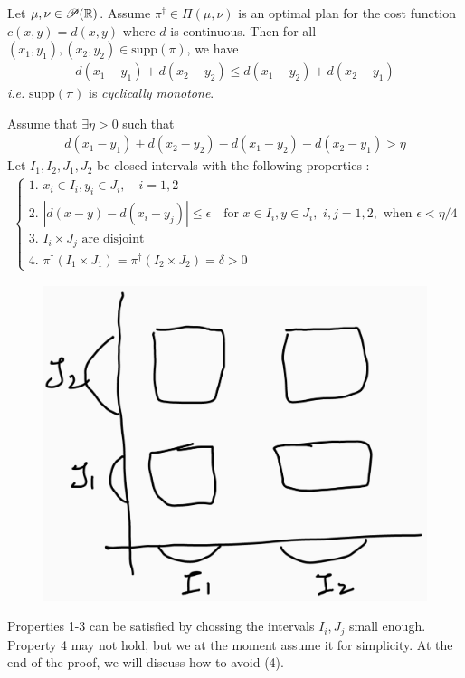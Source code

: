 \documentclass[12pt,a4paper]{article}
\newenvironment{proof}
{\begin{changemargin}{1cm}{0.5cm} 
	}%
	{\end{changemargin}
}
\newenvironment{p}
{\begin{proof} 
	}%
	{\end{proof}
}
\begin{document}
 Let $\mu, \nu \in\mathscr{P}(\mathbb{R})$. Assume $\pi^{\dagger} \in \Pi(\mu, \nu)$ is an optimal plan for the cost function $c(x,y) = d(x,y)$ where $d$ is continuous. Then for all $(x_1, y_1), (x_2, y_2) \in \text{supp}(\pi)$, we have
\begin{align*}
d(x_1 -y_1) + d(x_2-y_2) \leq d(x_1-y_2)+d(x_2-y_1)
\end{align*}
\textit{i.e.} $\text{supp}(\pi)$ is \emph{cyclically monotone}.
\begin{p}
\pf Assume that $\exists \eta>0$ such that
\begin{align*}
d(x_1-y_1) +d(x_2-y_2) - d(x_1-y_2) -d(x_2-y_1) > \eta
\end{align*}
Let $I_1, I_2, J_1, J_2$ be closed intervals with the following properties :
\begin{align*}
\begin{cases}
1. \,\, x_i \in I_i, y_i \in J_i, \quad i=1,2 \\
2. \,\, |d(x-y) - d(x_i -y_j)| \leq \epsilon \quad \text{for }x\in I_i, y\in J_i, \,\, i,j=1,2, \text{ when } \epsilon < \eta/4\\
3. \,\, I_i \times J_j \text{ are disjoint} \\
4. \,\, \pi^{\dagger}(I_1\times J_1) = \pi^{\dagger}(I_2\times J_2) =\delta >0
\end{cases}
\end{align*}
\begin{figure}[h]
\begin{center}
    \includegraphics[scale=0.15]{4}
\end{center}
\end{figure}
Properties 1-3 can be satisfied by chossing the intervals $I_i, J_j$ small enough. Property 4 may not hold, but we at the moment assume it for simplicity. At the end of the proof, we will discuss how to avoid (4).
\s


\end{p}
\end{document}
